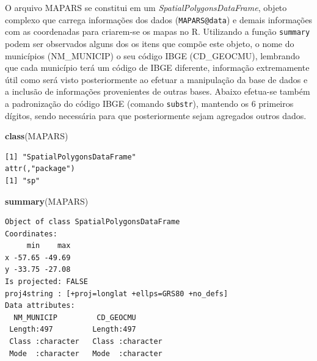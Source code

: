 \documentclass[12pt,brazil,oneside]{book}
\newenvironment{Shaded}{\begin{snugshade}}{\end{snugshade}}
\newcommand{\CommentTok}[1]{\textcolor[rgb]{0.56,0.35,0.01}{\textit{#1}}}
\newcommand{\KeywordTok}[1]{\textcolor[rgb]{0.13,0.29,0.53}{\textbf{#1}}}
\newcommand{\NormalTok}[1]{#1}
\newcommand{\OperatorTok}[1]{\textcolor[rgb]{0.81,0.36,0.00}{\textbf{#1}}}
\newcommand{\StringTok}[1]{\textcolor[rgb]{0.31,0.60,0.02}{#1}}
\begin{document}
\begin{Shaded}
\end{Shaded}

O arquivo MAPARS se constitui em um \emph{SpatialPolygonsDataFrame}, objeto complexo que carrega informações dos dados (\texttt{MAPARS@data}) e demais informações com as coordenadas para criarem-se os mapas no R. Utilizando a função \texttt{summary} podem ser observados alguns dos os itens que compõe este objeto, o nome do municípios (NM\_MUNICIP) o seu código IBGE (CD\_GEOCMU), lembrando que cada município terá um código de IBGE diferente, informação extremamente útil como será visto posteriormente ao efetuar a manipulação da base de dados e a inclusão de informações provenientes de outras bases. Abaixo efetua-se também a padronização do código IBGE (comando \texttt{substr}), mantendo os 6 primeiros dígitos, sendo necessária para que posteriormente sejam agregados outros dados.

\begin{Shaded}
\begin{Highlighting}[]
\KeywordTok{class}\NormalTok{(MAPARS)}
\end{Highlighting}
\end{Shaded}

\begin{verbatim}
[1] "SpatialPolygonsDataFrame"
attr(,"package")
[1] "sp"
\end{verbatim}

\begin{Shaded}
\begin{Highlighting}[]
\KeywordTok{summary}\NormalTok{(MAPARS)}
\end{Highlighting}
\end{Shaded}

\begin{verbatim}
Object of class SpatialPolygonsDataFrame
Coordinates:
     min    max
x -57.65 -49.69
y -33.75 -27.08
Is projected: FALSE 
proj4string : [+proj=longlat +ellps=GRS80 +no_defs]
Data attributes:
  NM_MUNICIP         CD_GEOCMU        
 Length:497         Length:497        
 Class :character   Class :character  
 Mode  :character   Mode  :character  
\end{verbatim}
\end{document}
